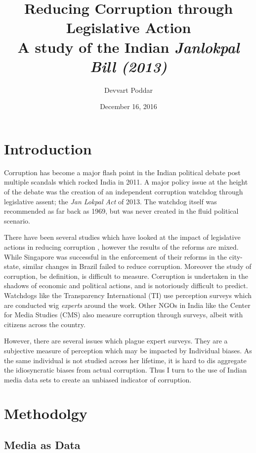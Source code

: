 \documentclass[twoside]{article}
\title{Reducing Corruption through Legislative Action\\
\LARGE A study of the Indian \textsl{Janlokpal Bill (2013)}}
\author{Devvart Poddar}
\date{December 16, 2016}
\begin{document}
\maketitle

{
\setcounter{tocdepth}{2}
\tableofcontents
}
\pagebreak

\section{Introduction}\label{introduction}

Corruption has become a major flash point in the Indian political debate
post multiple scandals which rocked India in 2011. A major policy issue
at the height of the debate was the creation of an independent
corruption watchdog through legislative assent; the \emph{Jan Lokpal
Act} of 2013. The watchdog itself was recommended as far back as 1969,
but was never created in the fluid political scenario.

There have been several studies which have looked at the impact of
legislative actions in reducing corruption
\citep[See][\citet{prado2016brazilian}]{quah2007combating}, however the
results of the reforms are mixed. While Singapore was successful in the
enforcement of their reforms in the city-state, similar changes in
Brazil failed to reduce corruption. Moreover the study of corruption, be
definition, is difficult to measure. Corruption is undertaken in the
shadows of economic and political actions, and is notoriously difficult
to predict. Watchdogs like the Transparency International (TI) use
perception surveys which are conducted wig \emph{experts} around the
work. Other NGOs in India like the Center for Media Studies (CMS) also
measure corruption through surveys, albeit with citizens across the
country.

However, there are several issues which plague expert surveys. They are
a subjective measure of perception which may be impacted by Individual
biases. As the same individual is not studied across her lifetime, it is
hard to dis aggregate the idiosyncratic biases from actual corruption.
Thus I turn to the use of Indian media data sets to create an unbiased
indicator of corruption.

\section{Methodolgy}\label{methodolgy}

\subsection{Media as Data}\label{media-as-data}
\end{document}
